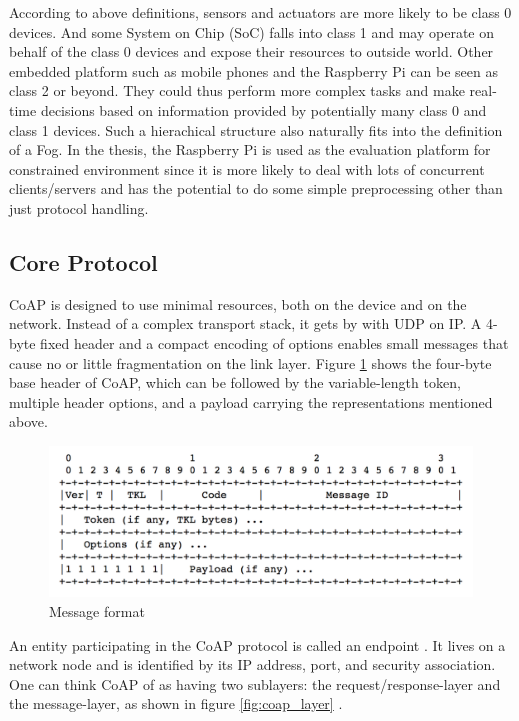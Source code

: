 According to above definitions, sensors and actuators are more likely to be class 0 devices. And some System on Chip (SoC) falls into class 1 and may operate on behalf of the class 0 devices and expose their resources to outside world. Other embedded platform such as mobile phones and the Raspberry Pi \cite{raspberry_pi} can be seen as class 2 or beyond. They could thus perform more complex tasks and make real-time decisions based on information provided by potentially many class 0 and class 1 devices. Such a hierachical structure also naturally fits into the definition of a Fog. In the thesis, the Raspberry Pi is used as the evaluation platform for constrained environment since it is more likely to deal with lots of concurrent clients/servers and has the potential to do some simple preprocessing other than just protocol handling.


\subsection{Core Protocol}\label{core_protocol}

CoAP is designed to use minimal resources, both on the device and on the network. Instead of a complex transport stack, it gets by with UDP on IP. A 4-byte fixed header and a compact encoding of options enables small messages that cause no or little fragmentation on the link layer. Figure \ref{fig:msg_format} \cite{coap_protocol} shows the four-byte base header of CoAP, which can be followed by the variable-length token, multiple header options, and a payload carrying the representations mentioned above.

\begin{figure}[!htbp]
\centering
\includegraphics[scale = 0.55]{msg_format.png}
\caption{Message format}
\label{fig:msg_format}
\end{figure}

An entity participating in the CoAP protocol is called an endpoint \cite{coap_protocol}. It lives on a network node and is identified by its IP address, port, and security association. One can think CoAP of as having two sublayers: the request/response-layer and the message-layer, as shown in figure \ref{fig:coap_layer} \cite{coap_protocol}.

